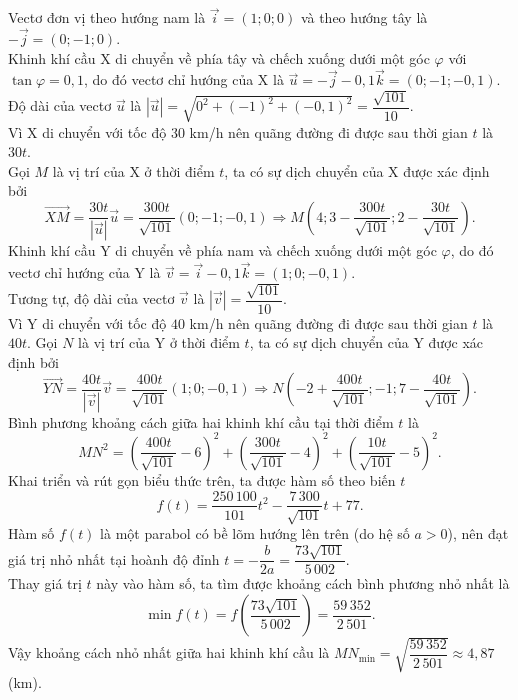\begin{ex}
{		Vectơ đơn vị theo hướng nam là $\overrightarrow{i} = (1; 0; 0)$ và theo hướng tây là $-\overrightarrow{j} = (0; -1; 0)$.\\
		Khinh khí cầu X di chuyển về phía tây và chếch xuống dưới một góc $\varphi$ với $\tan\varphi = 0{,}1$, do đó vectơ chỉ hướng của X là $\overrightarrow{u} = -\overrightarrow{j} - 0{,}1\overrightarrow{k} = (0; -1; -0{,}1)$.\\
		Độ dài của vectơ $\overrightarrow{u}$ là $\left|\overrightarrow{u}\right| = \sqrt{0^2 + (-1)^2 + (-0{,}1)^2} = \dfrac{\sqrt{101}}{10}$.\\
		Vì X di chuyển với tốc độ $30$ km/h nên quãng đường đi được sau thời gian $t$ là $30 t$.\\ Gọi $M$ là vị trí của X ở thời điểm $t$, ta có sự dịch chuyển của X được xác định bởi
		\[\overrightarrow{XM} = \dfrac{30 t}{\left|\overrightarrow{u}\right|}\overrightarrow{u} = \dfrac{300 t}{\sqrt{101}}(0; -1; -0{,}1) \Rightarrow M\left(4; 3 - \dfrac{300 t}{\sqrt{101}}; 2 - \dfrac{30 t}{\sqrt{101}}\right). \]
		Khinh khí cầu Y di chuyển về phía nam và chếch xuống dưới một góc $\varphi$, do đó vectơ chỉ hướng của Y là $\overrightarrow{v} = \overrightarrow{i} - 0{,}1\overrightarrow{k} = (1; 0; -0{,}1)$.\\
		Tương tự, độ dài của vectơ $\overrightarrow{v}$ là $|\overrightarrow{v}| = \dfrac{\sqrt{101}}{10}$.\\
		Vì Y di chuyển với tốc độ $40$ km/h nên quãng đường đi được sau thời gian $t$ là $40 t$. Gọi $N$ là vị trí của Y ở thời điểm $t$, ta có sự dịch chuyển của Y được xác định bởi
		\[\overrightarrow{YN} = \dfrac{40 t}{\left|\overrightarrow{v}\right|}\overrightarrow{v} = \dfrac{400 t}{\sqrt{101}}(1; 0; -0{,}1) \Rightarrow N\left(-2 + \dfrac{400 t}{\sqrt{101}}; -1; 7 - \dfrac{40 t}{\sqrt{101}}\right). \]
		Bình phương khoảng cách giữa hai khinh khí cầu tại thời điểm $t$ là
		\[MN^2 = \left(\dfrac{400 t}{\sqrt{101}} - 6 \right)^2 + \left(\dfrac{300 t}{\sqrt{101}} - 4 \right)^2 + \left(\dfrac{10 t}{\sqrt{101}} - 5 \right)^2. \]
		Khai triển và rút gọn biểu thức trên, ta được hàm số theo biến $t$
		\[f(t) = \dfrac{250\,100}{101}t^2 - \dfrac{7\,300}{\sqrt{101}}t + 77. \]	
		Hàm số $f(t)$ là một parabol có bề lõm hướng lên trên (do hệ số $a > 0$), nên đạt giá trị nhỏ nhất tại hoành độ đỉnh $t = -\dfrac{b}{2 a} = \dfrac{73\sqrt{101}}{5\,002}$.\\
		Thay giá trị $t$ này vào hàm số, ta tìm được khoảng cách bình phương nhỏ nhất là
		\[\min f(t) = f\left(\dfrac{73\sqrt{101}}{5\,002} \right) = \dfrac{59\,352}{2\,501}. \]
		Vậy khoảng cách nhỏ nhất giữa hai khinh khí cầu là $MN_{\min} = \sqrt{\dfrac{59\,352}{2\,501}} \approx 4{,}87$ (km).
	}
\end{ex}

